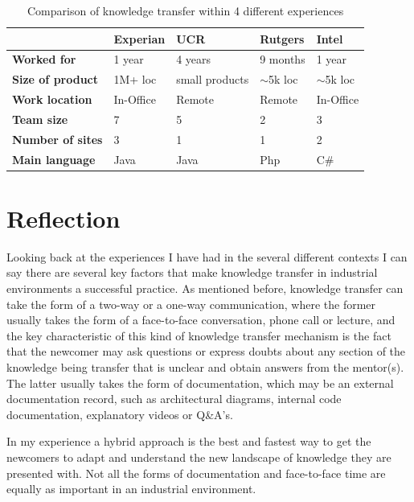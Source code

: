 \documentclass[12pt, letterpaper]{article}
\begin{document}
\begin{table}[] 
\centering
\caption{Comparison of knowledge transfer within 4 different experiences}
\label{comparisonTable}
\begin{tabular}{|l|l|l|l|l|}
\hline
                         & \textbf{Experian} & \textbf{UCR}   & \textbf{Rutgers} & \textbf{Intel} \\ \hline
\textbf{Worked for}      & 1 year            & 4 years        & 9 months         & 1 year         \\ \hline
\textbf{Size of product} & 1M+ loc           & small products & $\sim$5k loc     & $\sim$5k loc   \\ \hline
\textbf{Work location}   & In-Office         & Remote         & Remote           & In-Office      \\ \hline
\textbf{Team size}       & 7                 & 5              & 2                & 3              \\ \hline
\textbf{Number of sites} & 3                 & 1              & 1                & 2              \\ \hline
\textbf{Main language}   & Java              & Java           & Php              & C\#            \\ \hline
\end{tabular}
\end{table}

\section{Reflection}

Looking back at the experiences I have had in the several different contexts I can say there are several
key factors that make knowledge transfer in industrial environments a successful practice. As mentioned
before, knowledge transfer can take the form of a two-way or a one-way communication, where the former
usually takes the form of a face-to-face conversation, phone call or lecture, and the key characteristic
of this kind of knowledge transfer mechanism is the fact that the newcomer may ask questions or express
doubts about any section of the knowledge being transfer that is unclear and obtain
answers from the mentor(s). The latter usually takes the form of documentation, which may be an external 
documentation record, such as architectural diagrams, internal code documentation, explanatory videos or Q\&A's.

In my experience a hybrid approach is the best and fastest way to get the newcomers to adapt and understand
the new landscape of knowledge they are presented with. Not all the forms of documentation and face-to-face time
are equally as important in an industrial environment.
\end{document}
